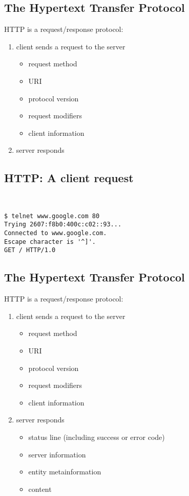 \documentclass[xga]{xdvislides}
\begin{document}
\subsection{The Hypertext Transfer Protocol}
HTTP is a request/response protocol:
\begin{enumerate}
	\item client sends a request to the server
		\begin{itemize}
			\item request method
			\item URI
			\item protocol version
			\item request modifiers
			\item client information
		\end{itemize}
	\item server responds
\end{enumerate}

\subsection{HTTP: A client request}
\vspace*{.5in}
\\
\Hugesize
\begin{center}
\begin{verbatim}
$ telnet www.google.com 80
Trying 2607:f8b0:400c:c02::93...
Connected to www.google.com.
Escape character is '^]'.
GET / HTTP/1.0

\end{verbatim}
\end{center}
\Normalsize
\vspace*{\fill}


\subsection{The Hypertext Transfer Protocol}
HTTP is a request/response protocol:
\begin{enumerate}
	\item client sends a request to the server
		\begin{itemize}
			\item request method
			\item URI
			\item protocol version
			\item request modifiers
			\item client information
		\end{itemize}
	\item server responds
		\begin{itemize}
			\item status line (including success or error code)
			\item server information
			\item entity metainformation
			\item content
		\end{itemize}
\end{enumerate}
\end{document}
